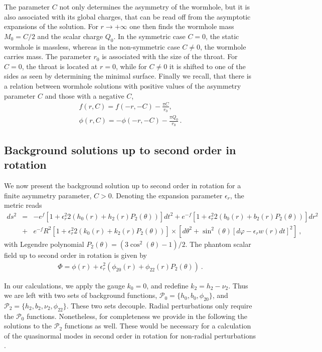 \documentclass[aps,prd,12pt,superscriptaddress]{revtex4-2}
\begin{document}
The parameter $C$ not only determines the asymmetry of the wormhole, but it is also associated with its global charges, that can be read off from the asymptotic expansions of the solution. 
For $r \to +\infty$ one then finds the wormhole mass $M_0 = C/2$ and the scalar charge $Q_{0}$.
In the symmetric case $C=0$, the static wormhole is massless, whereas in the non-symmetric case $C \neq 0$, the wormhole carries mass.
The parameter $r_0$ is associated with the size of the throat.
For $C=0$, the throat is located at $r=0$, while for $C\neq 0$ it is shifted to one of the sides as seen by determining the minimal surface.
Finally we recall, that there is a relation between wormhole solutions with positive values of the asymmetry parameter $C$ and those with a negative $C$,
\begin{eqnarray}
f(r,C) = f(-r,-C) - \frac{\pi C}{r_0}, \\
\phi(r,C) = -\phi(-r,-C) - \frac{\pi Q_0}{r_0} \,.
\end{eqnarray}


\subsection{Background solutions up to second order in rotation}

We now present the background solution up to second order in rotation for a finite asymmetry parameter, $C > 0$. Denoting the expansion parameter $\epsilon_r$,  the metric reads
\begin{eqnarray}
ds^2 &=& -e^{f}\left[1+\epsilon_r^2 2\left(h_0(r)+h_2(r)P_2(\theta)\right)\right]dt^2 
+ e^{-f}\left[1+\epsilon_r^2 2\left(b_0(r)+b_2(r)P_2(\theta)\right)\right]dr^2 \nonumber \\ 
&+& 
{e^{-f}} R^2
\left[1+\epsilon_r^2 2\left(k_0(r)+k_2(r)P_2(\theta)\right)\right]
\times 
\left[
d\theta^2+\sin^2{(\theta)}\left[d\varphi-\epsilon_rw(r)dt\right]^2 
\right]
\ ,
\label{metric_1}
\end{eqnarray}
with Legendre polynomial $P_2(\theta) = \left(3\cos^2{(\theta)}-1\right)/2$.
The phantom scalar field up to second order in rotation is given by
\begin{eqnarray}
\Phi = \phi(r) + \epsilon_r^2 \left(\phi_{20}(r)+\phi_{22}(r)P_2(\theta)\right) \ .
\label{scalar_1}
\end{eqnarray}

In our calculations, we apply the gauge $k_0=0$, and redefine $k_2=h_2-\nu_2$.
Thus we are left with two sets of background functions, $\mathcal{P}_0=\{h_0,{b_0},\phi_{20}\}$, and $\mathcal{P}_2=\{{h_2}, b_2, \nu_2, \phi_{22}\}$.
These two sets decouple.
Radial perturbations only require the $\mathcal{P}_0$ functions.
Nonetheless, for completeness we provide in the following the solutions to the $\mathcal{P}_2$ functions as well.
These would be necessary for a calculation of the quasinormal modes in second order in rotation for non-radial perturbations \cite{Blazquez-Salcedo:2022eik}.
\end{document}
